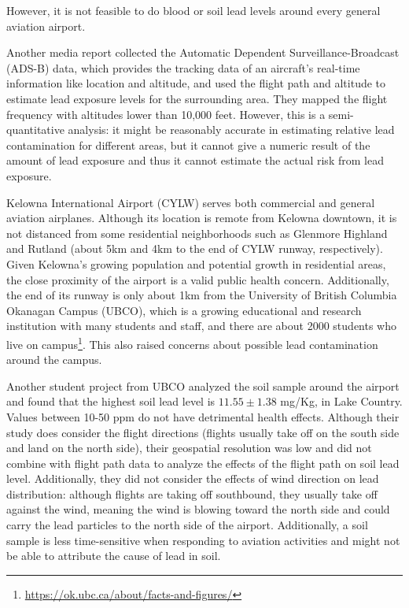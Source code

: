 \documentclass[12pt]{article}
\begin{document}
 However, it is not feasible to do blood or soil lead levels around every general aviation airport. 

 Another media report collected the Automatic Dependent Surveillance-Broadcast (ADS-B) data, which provides the tracking data of an aircraft's real-time information like location and altitude, and used the flight path and altitude to estimate lead exposure levels for the surrounding area. They mapped the flight frequency with altitudes lower than 10,000 feet. \cite{noauthor_you_2022} However, this is a semi-quantitative analysis: it might be reasonably accurate in estimating relative lead contamination for different areas, but it cannot give a numeric result of the amount of lead exposure and thus it cannot estimate the actual risk from lead exposure. 

Kelowna International Airport (CYLW) serves both commercial and general aviation airplanes. Although its location is remote from Kelowna downtown, it is not distanced from some residential neighborhoods such as Glenmore Highland and Rutland (about 5km and 4km to the end of CYLW runway, respectively). Given Kelowna's growing population and potential growth in residential areas, the close proximity of the airport is a valid public health concern. Additionally, the end of its runway is only about 1km from the University of British Columbia Okanagan Campus (UBCO), which is a growing educational and research institution with many students and staff, and there are about 2000 students who live on campus\footnote{\url{https://ok.ubc.ca/about/facts-and-figures/}}. This also raised concerns about possible lead contamination around the campus.

Another student project from UBCO analyzed the soil sample around the airport and found that the highest soil lead level is $11.55\pm 1.38$ mg/Kg, in Lake Country. \cite{harrison_lead_nodate} Values between 10-50 ppm do not have detrimental health effects. \cite{noauthor_lead_nodate} Although their study does consider the flight directions (flights usually take off on the south side and land on the north side), their geospatial resolution was low and did not combine with flight path data to analyze the effects of the flight path on soil lead level. Additionally, they did not consider the effects of wind direction on lead distribution: although flights are taking off southbound, they usually take off against the wind, meaning the wind is blowing toward the north side and could carry the lead particles to the north side of the airport. \cite{harrison_lead_nodate} Additionally, a soil sample is less time-sensitive when responding to aviation activities and might not be able to attribute the cause of lead in soil. 
\end{document}
